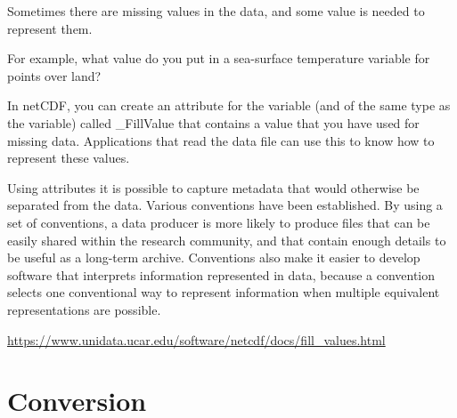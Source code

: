 \tab
\begin{framed}

Sometimes there are missing values in the data, and some value is needed to represent them.

For example, what value do you put in a sea-surface temperature variable for points over land?

In netCDF, you can create an attribute for the variable (and of the same type as the variable) called \_FillValue that contains a value that you have used for missing data. Applications that read the data file can use this to know how to represent these values.

Using attributes it is possible to capture metadata that would otherwise be separated from the data. Various conventions have been established. By using a set of conventions, a data producer is more likely to produce files that can be easily shared within the research community, and that contain enough details to be useful as a long-term archive. Conventions also make it easier to develop software that interprets information represented in data, because a convention selects one conventional way to represent information when multiple equivalent representations are possible.

\url{https://www.unidata.ucar.edu/software/netcdf/docs/fill_values.html}

\end{framed}

\section{Conversion}

